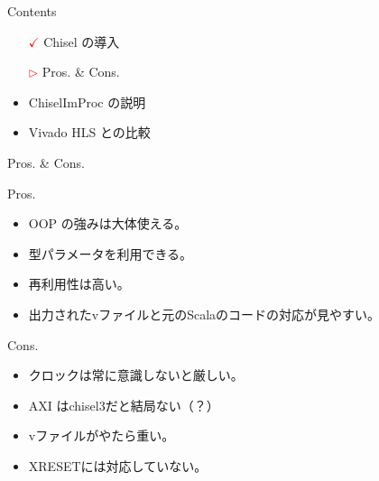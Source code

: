 
\begin{frame}{Contents}
   \begin{itemize}
       \item[\textcolor{red}{$\checkmark$}] Chisel の導入
       \item[\textcolor{red}{$\rhd$}] Pros. \& Cons.
       \item ChiselImProc の説明
       \item Vivado HLS との比較
   \end{itemize} 
\end{frame}



\begin{frame}{Pros. \& Cons.}
            \begin{block}{Pros.}
                \begin{itemize}
                    \item OOP の強みは大体使える。
                    \item 型パラメータを利用できる。
                    \item 再利用性は高い。
                    \item 出力されたvファイルと元のScalaのコードの対応が見やすい。
                    
                \end{itemize}
            \end{block}
            \begin{block}{Cons.}
                \begin{itemize}
                    \item クロックは常に意識しないと厳しい。
                    \item AXI はchisel3だと結局ない（？）
                    \item vファイルがやたら重い。
                    \item XRESETには対応していない。
                \end{itemize}
            \end{block}
    
\end{frame}

